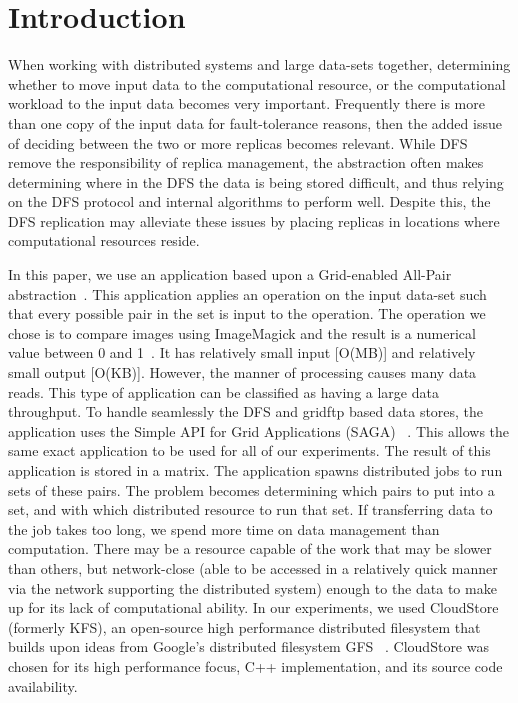 \documentclass{rspublic}
\newcommand{\jhanote}[1]{ {\textcolor{red} { ***Jha: #1 }}}
\newcommand{\jhanote}[1]{}
\begin{document}
\section{Introduction} When working with distributed systems and large
data-sets together, determining whether to move input data to the
computational resource, or the computational workload to the input data
becomes very important. Frequently there is more than one copy of the
input data for fault-tolerance reasons, then the added issue of deciding
between the two or more replicas becomes relevant. While DFS remove the
responsibility of replica management, the abstraction often makes
determining where in the DFS the data is being stored difficult, and
thus relying on the DFS protocol and internal algorithms to perform
well. Despite this, the DFS replication may alleviate these issues by
placing replicas in locations where computational resources reside.


In this paper, we use an application based upon a Grid-enabled All-Pair
abstraction~\citep{Interop, AllPairs}. This application applies an
operation on the input data-set such that every possible pair in the set
is input to the operation. The operation we chose is to compare images
using ImageMagick and the result is a numerical value between 0 and
1~\citep{imagemagick}. It has relatively small input [O(MB)] and
relatively small output [O(KB)]. However, the manner of processing
causes many data reads. This type of application can be classified as
having a large data throughput. To handle seamlessly the DFS and gridftp
based data stores, the application uses the Simple API for Grid
Applications (SAGA) ~\citep{saga_web}. This allows the same exact
application to be used for all of our experiments. The result of this
application is stored in a matrix. The application spawns distributed
jobs to run sets of these pairs.  The problem becomes determining which
pairs to put into a set, and with which distributed resource to run that
set. If transferring data to the job takes too long, we spend more time
on data management than computation. There may be a resource capable of
the work that may be slower than others, but network-close (able to be
accessed in a relatively quick manner via the network supporting the
distributed system) enough to the data to make up for its lack of
computational ability. In our experiments, we used CloudStore (formerly
KFS), an open-source high performance distributed filesystem that builds
upon ideas from Google's distributed filesystem GFS ~\citep{kfs_web}.
CloudStore was chosen for its high performance focus, C++
implementation, and its source code availability.
\end{document}
